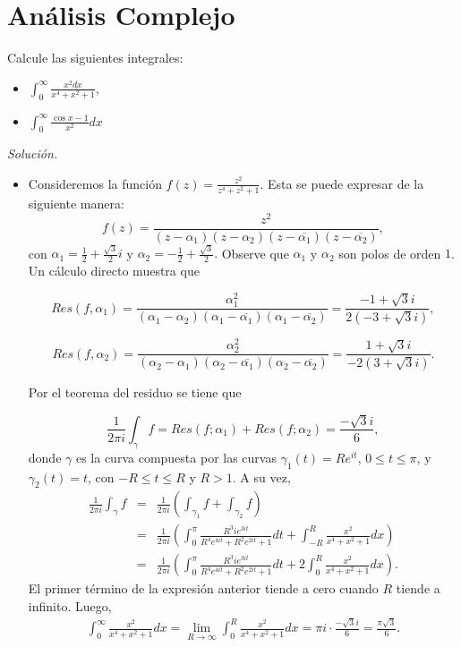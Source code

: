 \documentclass[12pt]{article}
\newenvironment{problem}[2][Problema]{\begin{trivlist}
\item[\hskip \labelsep {\bfseries #1}\hskip \labelsep {\bfseries #2.}]}{\end{trivlist}}
\begin{document}
\section*{Análisis Complejo}

\begin{problem}{1}
Calcule las siguientes integrales: \text{ }
\begin{itemize}
    \item[(a)] $\int_{0}^\infty \frac{x^2 dx}{x^4 + x^2 + 1}$,
    \item[(b)] $\int_{0}^\infty \frac{\cos x - 1}{x^2} dx$
\end{itemize}
\end{problem}
\textit{Solución.} \text{ }
\begin{itemize}
    \item[(a)] Consideremos la función $f(z) = \frac{z^2}{z^4 + z^2 + 1}$. Esta se puede expresar de la siguiente manera: 
    $$f(z) = \frac{z^2}{(z-\alpha_1) (z-\alpha_2) (z - \overline{\alpha_1}) (z - \overline{\alpha_2}) },$$
    con $\alpha_1 = \frac{1}{2} + \frac{\sqrt{3}}{2} i$ y $\alpha_2 = -\frac{1}{2} + \frac{\sqrt{3}}{2}.$ Observe que $\alpha_1$ y $\alpha_2$ son polos de orden $1$. Un cálculo directo muestra que
    
    $$ Res(f,\alpha_1) = \frac{\alpha_1^2}{(\alpha_1 - \alpha_2)(\alpha_1 - \overline{\alpha_1})(\alpha_1 - \overline{\alpha_2})} = \frac{-1 + \sqrt{3} i}{2(-3 + \sqrt{3} i)},$$
    
    $$ Res(f, \alpha_2) = \frac{\alpha_2^2}{(\alpha_2 - \alpha_1) (\alpha_2 - \overline{\alpha_1})(\alpha_2 - \overline{\alpha_2})} = \frac{1 + \sqrt{3} i}{ -2 (3 + \sqrt{3} i)}. $$
    
    Por el teorema del residuo se tiene que 
    
    $$\frac{1}{2\pi i} \int_\gamma f = Res(f; \alpha_1) + Res(f; \alpha_2) = \frac{- \sqrt{3} i}{6},$$
    donde $\gamma$ es la curva compuesta por las curvas $\gamma_1(t) = R e^{ i t}$, $0 \leq t \leq \pi$, y $\gamma_2(t) = t$, con $-R \leq t \leq R$ y $R > 1.$ A su vez, 
    \begin{eqnarray*}
    \frac{1}{2 \pi i} \int_\gamma f &=& \frac{1}{2 \pi i} \left( \int_{\gamma_1} f + \int_{\gamma_2} f \right) \\
    &=& \frac{1}{2 \pi i} \left( \int_0^\pi \frac{R^3 i e^{3it}}{R^4 e^{4it} + R^2e^{2it} + 1} dt + \int_{-R}^R \frac{x^2}{x^4 + x^2 +1 } dx \right) \\
    &=& \frac{1}{2 \pi i} \left( \int_0^\pi \frac{R^3 i e^{3it}}{R^4 e^{4it} + R^2e^{2it} + 1} dt + 2 \int_{0}^R \frac{x^2}{x^4 + x^2 +1 } dx \right).
    \end{eqnarray*}
    El primer término de la expresión anterior tiende a cero cuando $R$ tiende a infinito. Luego,
    \begin{eqnarray*}
    \int_0^\infty \frac{x^2}{x^4 + x^2 +1} dx = \lim_{R \to \infty} \int_0^R \frac{x^2}{x^4 + x^2 +1} dx = \pi i \cdot \frac{-\sqrt{3} i}{6} = \frac{ \pi \sqrt{3}}{6}.
    \end{eqnarray*}
    

\end{itemize}
\end{document}
